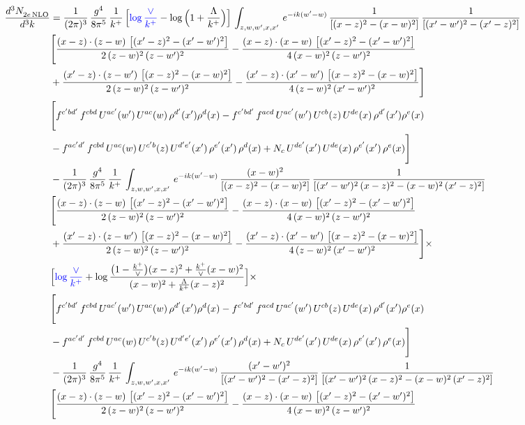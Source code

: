 \documentclass[9pt]{article}
\numberwithin{equation}{section}
\begin{document}
\begin{align}
 \frac{d^{3}N_{2e\,\rm NLO}^{\rm}}{d^{3}k}  & = \frac{1}{(2\pi)^{3}}\, \frac{g^{4}}{8\pi^{5}}\,\frac{1}{k^{+}}\,\Big[{\color{blue}\log\frac{\vee}{k^{+}}}-\log\Big(1+\frac{\Lambda}{k^{+}}\Big)\Big]\,\int_{z,w,w^{\prime},x,x'}\, e^{-ik(w^{\prime}-w)}\, \frac{1}{\left[(x-z)^{2}-(x-w)^{2}\right]}\, \frac{1}{\left[(x'-w')^{2} - (x'-z)^{2}\right]} \notag \\ & \Bigg[\frac{(x-z)\cdot (z-w)\, \left[(x'-z)^{2}-(x'-w')^{2}\right]}{2\, (z-w)^{2}\, (z-w')^{2}}  - \frac{(x-z)\cdot (x-w)\,\left[(x'-z)^{2}-(x'-w')^{2}\right] }{4\,(x-w)^{2}\,(z-w')^{2}}\notag \\ & +\frac{(x'-z)\cdot (z-w')\, \left[(x-z)^{2}-(x-w)^{2}\right]}{2\, (z-w)^{2}\, (z-w')^{2}}-\frac{(x'-z)\cdot (x'-w')\, \left[(x-z)^{2}-(x-w)^{2}\right]}{4\, (z-w)^{2}\,(x'-w')^{2}}\Bigg]\notag \\ & \Bigg[f^{c'bd'}\,f^{cbd}\, U^{ac'}(w')\,U^{ac}(w)\,\rho^{d'}(x')\rho^{d}(x)- f^{c'bd'}\,f^{acd}\,U^{ac'}(w')\,U^{cb}(z)\,U^{de}(x)\,\rho^{d'}(x')\rho^{e}(x) \notag \\ & -f^{ac'd'}\,f^{cbd}\,U^{ac}(w)\,U^{c'b}(z)\,U^{d'e'}(x')\,\rho^{e'}(x')\,\rho^{d}(x) +N_{c}\,U^{de'}(x')\,U^{de}(x)\,\rho^{e'}(x')\,\rho^{e}(x)\Bigg]\notag \\ & -\frac{1}{(2\pi)^{3}}\, \frac{g^{4}}{8\pi^{5}}\,\frac{1}{k^{+}}\,\int_{z,w,w^{\prime},x,x'}\, e^{-ik(w^{\prime}-w)}\,\frac{(x-w)^{2}}{\left[(x-z)^{2}-(x-w)^{2}\right]}\, \frac{1}{\left[(x'-w')^{2}\, (x-z)^{2} - (x-w)^{2}\, (x'-z)^{2}\right]} \notag \\ & \Bigg[\frac{(x-z)\cdot (z-w)\, \left[(x'-z)^{2}-(x'-w')^{2}\right]}{2\, (z-w)^{2}\, (z-w')^{2}}  - \frac{(x-z)\cdot (x-w)\,\left[(x'-z)^{2}-(x'-w')^{2}\right] }{4\,(x-w)^{2}\,(z-w')^{2}}\notag \\ & +\frac{(x'-z)\cdot (z-w')\, \left[(x-z)^{2}-(x-w)^{2}\right]}{2\, (z-w)^{2}\, (z-w')^{2}}-\frac{(x'-z)\cdot (x'-w')\, \left[(x-z)^{2}-(x-w)^{2}\right]}{4\, (z-w)^{2}\,(x'-w')^{2}}\Bigg]\times\,\notag \\ & \Big[{\color{blue}\log\frac{\vee}{k^{+}}}+\log\frac{\big(1-\frac{k^{+}}{\vee}\big)(x-z)^{2}+\frac{k^{+}}{\vee}(x-w)^{2}}{(x-w)^{2}+\frac{\Lambda}{k^{+}}(x-z)^{2}}\Big]\times\,\notag \\ & \Bigg[f^{c'bd'}\,f^{cbd}\, U^{ac'}(w')\,U^{ac}(w)\,\rho^{d'}(x')\rho^{d}(x)- f^{c'bd'}\,f^{acd}\,U^{ac'}(w')\,U^{cb}(z)\,U^{de}(x)\,\rho^{d'}(x')\rho^{e}(x) \notag \\ & -f^{ac'd'}\,f^{cbd}\,U^{ac}(w)\,U^{c'b}(z)\,U^{d'e'}(x')\,\rho^{e'}(x')\,\rho^{d}(x) +N_{c}\,U^{de'}(x')\,U^{de}(x)\,\rho^{e'}(x')\,\rho^{e}(x)\Bigg]\notag \\ & -\frac{1}{(2\pi)^{3}}\, \frac{g^{4}}{8\pi^{5}}\,\frac{1}{k^{+}}\,\int_{z,w,w^{\prime},x,x'}\, e^{-ik(w^{\prime}-w)}\, \frac{(x'-w')^{2}}{\left[(x'-w')^{2}-(x'-z)^{2}\right]}\, \frac{1}{\left[(x'-w')^{2}\, (x-z)^{2} - (x-w)^{2}\, (x'-z)^{2}\right]}  \notag \\ & \Bigg[\frac{(x-z)\cdot (z-w)\, \left[(x'-z)^{2}-(x'-w')^{2}\right]}{2\, (z-w)^{2}\, (z-w')^{2}}  - \frac{(x-z)\cdot (x-w)\,\left[(x'-z)^{2}-(x'-w')^{2}\right] }{4\,(x-w)^{2}\,(z-w')^{2}}\notag \\ & 
\end{align}
\end{document}
